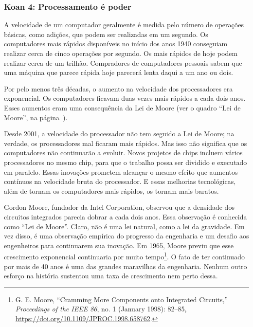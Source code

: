 \subsubsection*{Koan 4: Processamento é poder}
\label{cap1:exp-dig-koans:4}
A velocidade de um computador geralmente é medida pelo número de operações 
básicas, como adições, que podem ser realizadas em um segundo. Os computadores 
mais rápidos disponíveis no início dos anos 1940 conseguiam realizar cerca de 
cinco operações por segundo. Os mais rápidos de hoje podem realizar cerca de um 
trilhão. Compradores de computadores pessoais sabem que uma máquina que parece 
rápida hoje parecerá lenta daqui a um ano ou dois.

Por pelo menos três décadas, o aumento na velocidade dos processadores era 
exponencial. Os computadores ficavam duas vezes mais rápidos a cada dois anos. 
Esses aumentos eram uma consequência da Lei de Moore
(ver o quadro ``Lei de Moore'', na página~\pageref{qd:moore}).

Desde 2001, a velocidade do processador não tem seguido a Lei de Moore; na 
verdade, os processadores mal ficaram mais rápidos. Mas isso não significa que
os computadores não continuarão a evoluir. Novos projetos de chips
incluem vários processadores no mesmo chip, para que o trabalho possa ser
dividido e executado em paralelo. Essas inovações prometem alcançar o mesmo
efeito que aumentos contínuos na velocidade bruta do processador. E essas
melhorias tecnológicas, além de tornam os computadores mais rápidos, os
tornam mais baratos.

\begin{tcolorbox}[title={Lei de Moore}]
\label{qd:moore}
Gordon Moore, fundador da Intel Corporation, observou que a densidade dos 
circuitos integrados parecia dobrar a cada dois anos. Essa observação é 
conhecida como ``Lei de Moore''. Claro, não é uma lei natural, como a lei da
gravidade. Em vez disso, é uma observação empírica do progresso da engenharia e 
um desafio aos engenheiros para continuarem sua inovação. Em 1965, Moore previu 
que esse crescimento exponencial continuaria por muito tempo\footnote{G. E.
Moore, ``Cramming More Components onto Integrated Circuits,'' \textit{Proceedings
of the IEEE 86}, no. 1 (January 1998): 82--85, \url{https://doi.org/10.1109/JPROC.1998.658762}.}.
O fato de ter continuado por mais de 40 anos é uma das grandes maravilhas da
engenharia. Nenhum outro esforço na história sustentou uma taxa de crescimento
nem perto dessa.
\end{tcolorbox}

